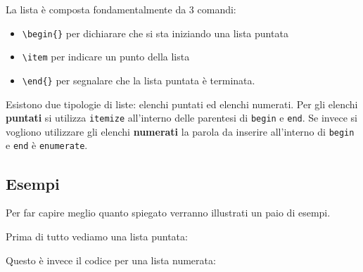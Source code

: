 La lista è composta fondamentalmente da 3 comandi:
\begin{itemize}
 \item \verb!\begin{}! per dichiarare che si sta iniziando una 
lista puntata
 \item \verb!\item! per indicare un punto della lista
 \item \verb!\end{}! per segnalare che la lista puntata è terminata.
\end{itemize}

Esistono due tipologie di liste: elenchi puntati ed elenchi numerati. Per gli 
elenchi \textbf{puntati} si utilizza \texttt{itemize} all'interno delle 
parentesi di \texttt{begin} e \texttt{end}. Se invece si vogliono utilizzare 
gli elenchi \textbf{numerati} la parola da inserire all'interno di 
\texttt{begin} e 
\texttt{end} è \texttt{enumerate}.

\subsection{Esempi}

Per far capire meglio quanto spiegato verranno illustrati un paio di esempi.

\noindent Prima di tutto vediamo una lista puntata:


\noindent Questo è invece il codice per una lista numerata:

